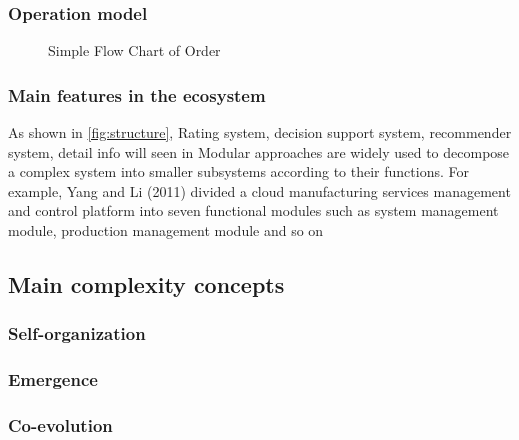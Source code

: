 \subsubsection{Operation model}
\begin{figure}[!h]
\centering\small
\resizebox{0.9\textwidth}{!}{}
\caption{Simple Flow Chart of Order}
\label{fig:simpleorderflow}
\end{figure}
\subsubsection{Main features in the ecosystem}
As shown in \autoref{fig:structure}, 
Rating system, decision support system, recommender system,
detail info will seen in
Modular approaches are widely used to decompose a complex system into smaller subsystems according to their functions. For example, Yang and Li (2011) divided a cloud manufacturing services management and control platform into seven functional modules such as system management module, production management module and so on


\subsection{Main complexity concepts} %
\label{sub:main_complexity_concepts}

\subsubsection{Self-organization}

\subsubsection{Emergence}

\subsubsection{Co-evolution}


